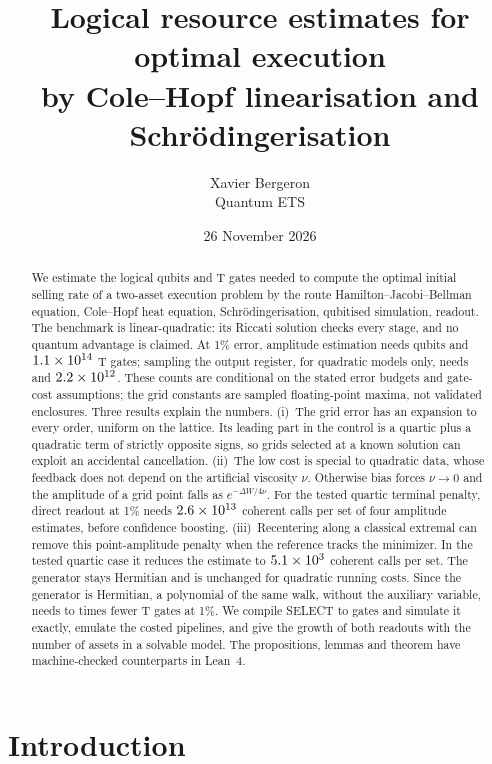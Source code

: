 \documentclass[11pt,a4paper]{article}
\title{\textbf{Logical resource estimates for optimal execution\\[0.2em]
by Cole--Hopf linearisation and Schr\"odingerisation}}
\author{Xavier Bergeron\\[0.2em]\normalsize Quantum ETS}
\date{26 November 2026}
\theoremstyle{remark}
\begin{document}
\maketitle

\begin{abstract}
\noindent
We estimate the logical qubits and T gates needed to compute the optimal
initial selling rate of a two-asset execution problem by the route
Hamilton--Jacobi--Bellman equation, Cole--Hopf heat equation,
Schr\"odingerisation, qubitised simulation, readout. The benchmark is
linear-quadratic: its Riccati solution checks every stage, and no quantum
advantage is claimed. At 1\% error, amplitude estimation needs \QAOne{} qubits and $1.1\times10^{14}$ T gates;
sampling the output register, for quadratic models only, needs \QBOne{} and $2.2\times10^{12}$.
These counts are conditional on the stated error budgets and gate-cost assumptions;
the grid constants are sampled floating-point maxima, not validated enclosures.
Three results explain
the numbers. (i)~The grid error has an expansion to every order, uniform on the lattice. Its leading part in the
control is a quartic plus a quadratic term of strictly opposite signs, so grids selected at
a known solution can exploit an accidental cancellation. (ii)~The low cost is special to quadratic data,
whose feedback does not depend on the artificial viscosity $\nu$. Otherwise bias forces $\nu\to0$ and the
amplitude of a grid point falls as $e^{-\Delta W/4\nu}$. For the tested quartic terminal penalty, direct
readout at 1\% needs $2.6\times10^{13}$ coherent calls per set of four amplitude estimates, before confidence
boosting. (iii)~Recentering along a classical extremal can remove this point-amplitude penalty when the
reference tracks the minimizer. In the tested quartic case it reduces the estimate to $5.1\times10^{3}$ coherent
calls per set. The generator stays Hermitian and is unchanged for quadratic running costs. Since the generator is
Hermitian, a polynomial of the same walk, without the auxiliary
variable, needs \DirB{} to \DirA{} times fewer T gates at 1\%. We compile
SELECT to gates and simulate it exactly, emulate the costed
pipelines, and give the growth of both readouts with the number of assets in a
solvable model. The propositions, lemmas and theorem have machine-checked
counterparts in Lean~4.
\end{abstract}

\section{Introduction}
\end{document}
